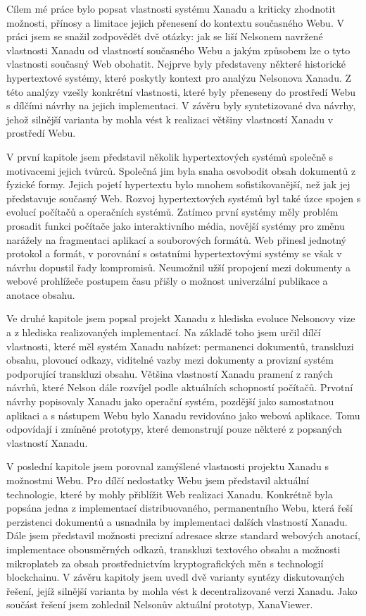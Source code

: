 Cílem mé práce bylo popsat vlastnosti systému Xanadu a kriticky zhodnotit možnosti, přínosy a limitace jejich přenesení do kontextu současného Webu. V práci jsem se snažil zodpovědět dvě otázky: jak se liší Nelsonem navržené vlastnosti Xanadu od vlastností současného Webu a jakým způsobem lze o tyto vlastnosti současný Web obohatit.
Nejprve byly představeny některé historické hypertextové systémy, které poskytly kontext pro analýzu Nelsonova Xanadu. Z této analýzy vzešly konkrétní vlastnosti, které byly přeneseny do prostředí Webu s dílčími návrhy na jejich implementaci. V závěru byly syntetizované dva návrhy, jehož silnější varianta by mohla vést k realizaci většiny vlastností Xanadu v prostředí Webu.

V první kapitole jsem představil několik hypertextových systémů společně s motivacemi jejich tvůrců. Společná jim byla snaha osvobodit obsah dokumentů z fyzické formy. Jejich pojetí hypertextu bylo mnohem sofistikovanější, než jak jej představuje současný Web. Rozvoj hypertextových systémů byl také úzce spojen s evolucí počítačů a operačních systémů. Zatímco první systémy měly problém prosadit funkci počítače jako interaktivního média, novější systémy pro změnu narážely na fragmentaci aplikací a souborových formátů.
Web přinesl jednotný protokol a formát, v porovnání s ostatními hypertextovými systémy se však v návrhu dopustil řady kompromisů. Neumožnil užší propojení mezi dokumenty a webové prohlížeče postupem času přišly o možnost univerzální publikace a anotace obsahu.

Ve druhé kapitole jsem popsal projekt Xanadu z hlediska evoluce Nelsonovy vize a z hlediska realizovaných implementací. Na základě toho jsem určil dílčí vlastnosti, které měl systém Xanadu nabízet: permanenci dokumentů, transkluzi obsahu, plovoucí odkazy, viditelné vazby mezi dokumenty a provizní systém podporující transkluzi obsahu.
Většina vlastností Xanadu pramení z raných návrhů, které Nelson dále rozvíjel podle aktuálních schopností počítačů. Prvotní návrhy popisovaly Xanadu jako operační systém, pozdější jako samostatnou aplikaci a s nástupem Webu bylo Xanadu revidováno jako webová aplikace. Tomu odpovídají i zmíněné prototypy, které demonstrují pouze některé z popsaných vlastností Xanadu.

V poslední kapitole jsem porovnal zamýšlené vlastnosti projektu Xanadu s možnostmi Webu. Pro dílčí nedostatky Webu jsem představil aktuální technologie, které by mohly přiblížit Web realizaci Xanadu. Konkrétně byla popsána jedna z implementací distribuovaného, permanentního Webu, která řeší perzistenci dokumentů a usnadnila by implementaci dalších vlastností Xanadu. Dále jsem představil možnosti precizní adresace skrze standard webových anotací, implementace obousměrných odkazů, transkluzi textového obsahu a možnosti mikroplateb za obsah prostřednictvím kryptografických měn s technologií blockchainu. V závěru kapitoly jsem uvedl dvě varianty syntézy diskutovaných řešení, jejíž silnější varianta by mohla vést k decentralizované verzi Xanadu. Jako součást řešení jsem zohlednil Nelsonův aktuální prototyp, XanaViewer.

